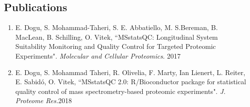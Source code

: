 \documentclass[11pt]{article}
\begin{document}
\vspace{-.6cm}
\subsection*{Publications}
\begin{enumerate}
\vspace{-0.22cm}
\item E. Dogu, S. Mohammad-Taheri, S. E. Abbatiello, M. S.Bereman, B. MacLean, B. Schilling, O. Vitek, ``MSstatsQC: Longitudinal System Suitability Monitoring and Quality Control for Targeted Proteomic Experiments". {\it Molecular and Cellular Proteomics}. 2017
\item E. Dogu, S. Mohammad Taheri, R. Olivelia, F. Marty, Ian Lienert, L. Reiter, E. Sabidó, O. Vitek, ``MSstatsQC 2.0: R/Bioconductor package for statistical quality control of mass spectrometry-based proteomic experiments". {\it J. Proteome Res.}2018
\end{enumerate}

\vspace{-0.9cm}
\end{document}
